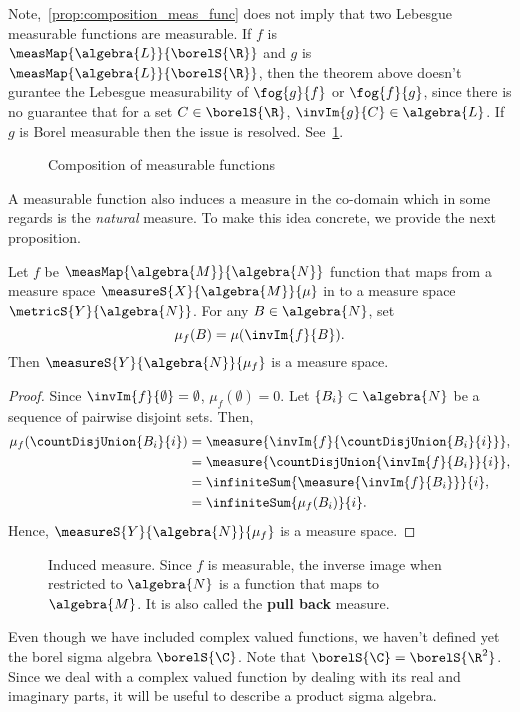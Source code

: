 \begin{Remark}
    Note,~\ref{prop:composition_meas_func} does not imply that two Lebesgue measurable functions are measurable. 
    If $f$ is
    $\measMap{\algebra{L}}{\borelS{\R}}$ and $g$ is $\measMap{\algebra{L}}{\borelS{\R}}$, then the theorem
    above doesn't gurantee the Lebesgue measurability of $\fog{g}{f}$ or $\fog{f}{g}$, since there is no
    guarantee that for a set $C \in \borelS{\R}$, $\invIm{g}{C} \in {\algebra{L}}$. If $g$ is Borel measurable
    then the issue is resolved. See~\ref{fig:tikz:measurable_maps_comp}.
\end{Remark}
\begin{figure}
  
  \caption{Composition of measurable functions}\label{fig:tikz:measurable_maps_comp}
\end{figure}
A measurable function also induces a measure in the co-domain which in some regards is the \emph{natural}
measure. To make this idea concrete, we provide the next proposition.
\begin{Proposition}[name=Induced measure]\label{prop:induced_meas}
    Let $f$ be $\measMap{\algebra{M}}{\algebra{N}}$ function that maps from a measure space
    $\measureS{X}{\algebra{M}}{\mu}$ in to a measure space $\metricS{Y}{\algebra{N}}$. For any $B\in
    \algebra{N}$, set
    \[\mu_{f}(B) = \mu(\invIm{f}{B}).\]
    Then $\measureS{Y}{\algebra{N}}{\mu_f}$ is a measure space.
\end{Proposition}
\begin{proof}
    Since $\invIm{f}{\emptyset} = \emptyset$, $\mu_f(\emptyset) = 0$. Let $\lbrace B_i \rbrace \subset
    \algebra{N}$ be a sequence of pairwise disjoint sets. Then,
    \begin{align*}
	\mu_f(\countDisjUnion{B_i}{i}) &= \measure{\invIm{f}{\countDisjUnion{B_i}{i}}},\\ 
	&= \measure{\countDisjUnion{\invIm{f}{B_i}}{i}}, \\
	&= \infiniteSum{\measure{\invIm{f}{B_i}}}{i}, \\
	&= \infiniteSum{\mu_f(B_i)}{i}.
    \end{align*}
    Hence, $\measureS{Y}{\algebra{N}}{\mu_f}$ is a measure space. 
\end{proof}

\begin{figure}
  
  \caption{Induced measure. Since $f$ is measurable, the inverse image when restricted to $\algebra{N}$ is a
      function that maps to $\algebra{M}$. 
      It is also called the \textbf{pull back} measure.}\label{fig:tikz:induced_measure}
\end{figure}
Even though we have included complex valued functions, we haven't defined yet the borel sigma algebra
$\borelS{\C}$. Note that $\borelS{\C} = \borelS{\R^{2}}$. Since we deal with a complex valued function by
dealing with its real and imaginary parts, it will be useful to describe a product sigma
algebra.

